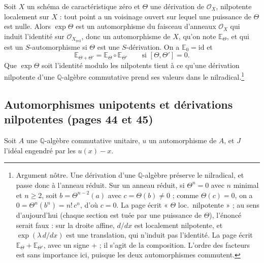 \documentclass[11pt,a4paper]{article}
\begin{document}
Soit $X$ un schéma de caractéristique zéro et $\Theta$ une dérivation de
$\mathcal{O}_X$, nilpotente localement sur $X$ : tout point a un voisinage
ouvert sur lequel une puissance de $\Theta$ est nulle. Alors $\exp \Theta$ est
un automorphisme du faisceau d'anneaux $\mathcal{O}_X$ qui induit l'identité
sur $\mathcal{O}_{X_{\mathrm{red}}}$, donc un automorphisme de $X$, qu'on note
$\mathbb{E}_\Theta$, et qui est un $S$-automorphisme si $\Theta$ est une
$S$-dérivation. On a $\mathbb{E}_0 = \mathrm{id}$ et
\[
\mathbb{E}_{\Theta + \Theta'} = \mathbb{E}_\Theta \circ \mathbb{E}_{\Theta'}
\qquad\text{si } [\Theta, \Theta'] = 0 .
\]
Que $\exp \Theta$ soit l'identité modulo les nilpotents tient à ce qu'une
dérivation nilpotente d'une $\mathbb{Q}$-algèbre commutative prend ses
valeurs dans le nilradical.\footnote{Argument nôtre. Une dérivation d'une
$\mathbb{Q}$-algèbre préserve le nilradical, et passe donc à l'anneau réduit.
Sur un anneau réduit, si $\Theta^n = 0$ avec $n$ minimal et $n \geqslant 2$,
soit $b = \Theta^{n-2}(a)$ avec $c = \Theta(b) \neq 0$ ; comme
$\Theta(c) = 0$, on a $0 = \Theta^n(b^n) = n!\, c^n$, d'où $c = 0$. La page
écrit « $\Theta$ loc.\ nilpotente » ; au sens d'aujourd'hui (chaque section
est tuée par une puissance de $\Theta$), l'énoncé serait faux : sur la droite
affine, $d/dx$ est localement nilpotente, et $\exp(\lambda\, d/dx)$ est une
translation, qui n'induit pas l'identité. La page écrit
$\mathbb{E}_\Theta + \mathbb{E}_{\Theta'}$, avec un signe $+$ ; il s'agit de
la composition. L'ordre des facteurs est sans importance ici, puisque les
deux automorphismes commutent.}

\subsection*{Automorphismes unipotents et dérivations nilpotentes (pages 44 et 45)}

Soit $A$ une $\mathbb{Q}$-algèbre commutative unitaire, $u$ un automorphisme
de $A$, et $J$ l'idéal engendré par les $u(x) - x$.
\end{document}
